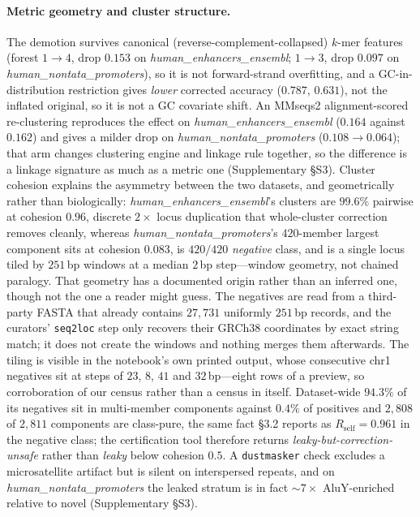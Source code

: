 \documentclass[11pt,a4paper]{article}
\begin{document}
\paragraph{Metric geometry and cluster structure.} The demotion survives canonical (reverse-complement-collapsed) $k$-mer features (forest $1\to4$, drop $0.153$ on \textit{human\_enhancers\_ensembl}; $1\to3$, drop $0.097$ on \textit{human\_nontata\_promoters}), so it is not forward-strand overfitting, and a GC-in-distribution restriction gives \emph{lower} corrected accuracy ($0.787$, $0.631$), not the inflated original, so it is not a GC covariate shift. An MMseqs2 alignment-scored re-clustering reproduces the effect on \textit{human\_enhancers\_ensembl} ($0.164$ against $0.162$) and gives a milder drop on \textit{human\_nontata\_promoters} ($0.108\to0.064$); that arm changes clustering engine and linkage rule together, so the difference is a linkage signature as much as a metric one (Supplementary \S S3). Cluster cohesion explains the asymmetry between the two datasets, and geometrically rather than biologically: \textit{human\_enhancers\_ensembl}'s clusters are $99.6\%$ pairwise at cohesion $0.96$, discrete $2\times$ locus duplication that whole-cluster correction removes cleanly, whereas \textit{human\_nontata\_promoters}'s $420$-member largest component sits at cohesion $0.083$, is $420/420$ \emph{negative} class, and is a single locus tiled by $251$\,bp windows at a median $2$\,bp step---window geometry, not chained paralogy. That geometry has a documented origin rather than an inferred one, though not the one a reader might guess. The negatives are read from a third-party FASTA that already contains $27{,}731$ uniformly $251$\,bp records, and the curators' \texttt{seq2loc} step only recovers their GRCh38 coordinates by exact string match; it does not create the windows and nothing merges them afterwards. The tiling is visible in the notebook's own printed output, whose consecutive chr1 negatives sit at steps of $23$, $8$, $41$ and $32$\,bp---eight rows of a preview, so corroboration of our census rather than a census in itself. Dataset-wide $94.3\%$ of its negatives sit in multi-member components against $0.4\%$ of positives and $2{,}808$ of $2{,}811$ components are class-pure, the same fact \S3.2 reports as $R_{\mathrm{self}}=0.961$ in the negative class; the certification tool therefore returns \emph{leaky-but-correction-unsafe} rather than \emph{leaky} below cohesion $0.5$. A \texttt{dustmasker} check excludes a microsatellite artifact but is silent on interspersed repeats, and on \textit{human\_nontata\_promoters} the leaked stratum is in fact ${\sim}7\times$ AluY-enriched relative to novel (Supplementary \S S3).
\end{document}
